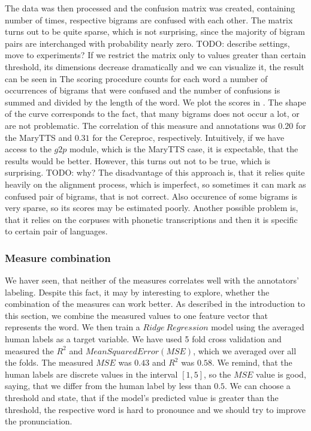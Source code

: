 The data was then processed and the confusion matrix was created, containing number of times, respective bigrams are confused with each other.
The matrix turns out to be quite sparse, which is not surprising, since the majority of bigram pairs are interchanged with probability nearly zero.
TODO: describe settings, move to experiments?
If we restrict the matrix only to values greater than certain threshold, its dimensions decrease dramatically and we can visualize it, the result can be seen in 
The scoring procedure counts for each word a number of occurrences of bigrams that were confused and the number of confusions is summed and divided by the length of the word.
We plot the scores in .
The shape of the curve corresponds to the fact, that many bigrams does not occur a lot, or are not problematic.
The correlation of this measure and annotations was $0.20$ for the MaryTTS and $0.31$ for the Cereproc, respectively.
Intuitively, if we have access to the $g2p$ module, which is the MaryTTS case, it is expectable, that the results would be better.
However, this turns out not to be true, which is surprising.
TODO: why?
\linebreak\linebreak
The disadvantage of this approach is, that it relies quite heavily on the alignment process, which is imperfect, so sometimes it can mark as confused pair of bigrams, that is not correct.
Also occurence of some bigrams is very sparse, so its scores may be estimated poorly.
Another possible problem is, that it relies on the corpuses with phonetic transcriptions and then it is specific to certain pair of languages.
\subsubsection{Measure combination}
We haver seen, that neither of the measures correlates well with the annotators' labeling.
Despite this fact, it may by interesting to explore, whether the combination of the measures can work better.
As described in the introduction to this section, we combine the measured values to one feature vector that represents the word.
We then train a $Ridge\: Regression$ model using the averaged human labels as a target variable.
We have used 5 fold cross validation and measured the $R^2$ and $Mean Squared Error (MSE)$, which we averaged over all the folds.
The measured $MSE$ was $0.43$ and $R^2$ was $0.58$.
We remind, that the human labels are discrete values in the interval $[1,5]$, so the $MSE$ value is good, saying, that we differ from the human label by less than $0.5$.
We can choose a threshold and state, that if the model's predicted value is greater than the threshold, the respective word is hard to pronounce and we should try to improve the pronunciation.
